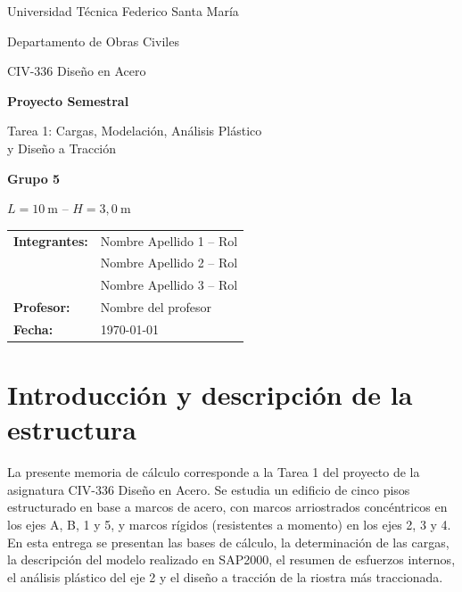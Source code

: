 \documentclass[11pt,letterpaper]{article}
\begin{document}
\begin{titlepage}
\centering
{\large Universidad Técnica Federico Santa María\par}
{\large Departamento de Obras Civiles\par}
\vspace{3cm}
{\Large CIV-336 Diseño en Acero\par}
\vspace{1cm}
{\huge\bfseries Proyecto Semestral\par}
\vspace{0.4cm}
{\LARGE Tarea 1: Cargas, Modelación, Análisis Plástico\\ y Diseño a Tracción\par}
\vspace{2cm}
{\Large\bfseries Grupo 5\par}

\vspace{0.3cm}
{\large $L = 10\ \mathrm{m}$ \quad -- \quad $H = 3{,}0\ \mathrm{m}$\par}
\vfill
\begin{flushleft}
\begin{tabular}{ll}
\textbf{Integrantes:} & Nombre Apellido 1 -- Rol \\
                      & Nombre Apellido 2 -- Rol \\
                      & Nombre Apellido 3 -- Rol \\[0.3cm]
\textbf{Profesor:}    & Nombre del profesor \\
\textbf{Fecha:}       & \today
\end{tabular}
\end{flushleft}
\end{titlepage}

\tableofcontents
\newpage

\section{Introducción y descripción de la estructura}

La presente memoria de cálculo corresponde a la Tarea 1 del proyecto de la asignatura
CIV-336 Diseño en Acero. Se estudia un edificio de cinco pisos estructurado en base a marcos de acero,
con marcos arriostrados concéntricos en los ejes A, B, 1 y 5, y marcos rígidos (resistentes a momento)
en los ejes 2, 3 y 4. En esta entrega se presentan las bases de cálculo, la determinación de las cargas,
la descripción del modelo realizado en SAP2000, el resumen de esfuerzos internos, el análisis plástico del
eje 2 y el diseño a tracción de la riostra más traccionada.
\end{document}
